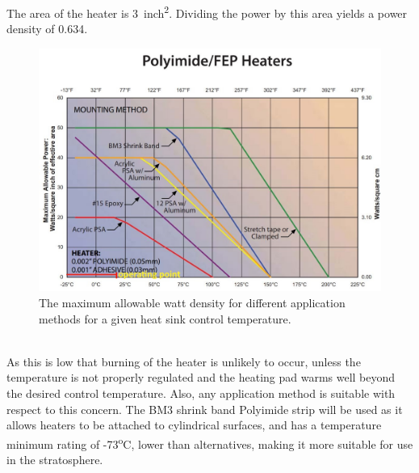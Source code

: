 {The area of the heater is \SI{3}{inch^{2}}. Dividing the power by this area yields a power density of \SI{0.634}{}. 

	\begin{figure}[h!]
    \centering
    \includegraphics[scale=0.6]{4-experiment-design/img/mechanical/wattdensity.jpg}
	\caption{The maximum allowable watt density for different application methods for a given heat sink control temperature.}
	\label{fig:thermalresistance1}
	\end{figure} \\

As this is low that burning of the heater is unlikely to occur, unless the temperature is not properly regulated and the heating pad warms well beyond the desired control temperature. Also, any application method is suitable with respect to this concern. The BM3 shrink band Polyimide strip will be used as it allows heaters to be attached to cylindrical surfaces, and has a temperature minimum rating of -73\textsuperscript{o}C, lower than alternatives, making it more suitable for use in the stratosphere.  \\}
 

\label{sec:4.6.5}
